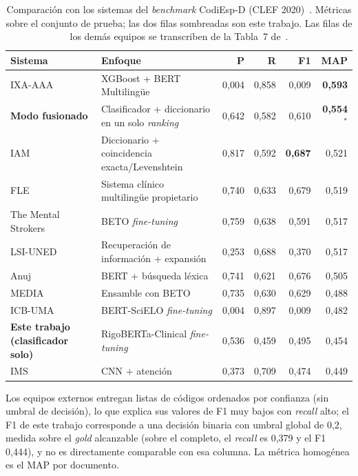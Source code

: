\begin{table}[!tp]
\centering
\small
\caption{Comparación con los sistemas del \emph{benchmark} CodiEsp-D (CLEF 2020)~\protect\cite{miranda2020}. Métricas sobre el conjunto de prueba; las dos filas sombreadas son este trabajo. Las filas de los demás equipos se transcriben de la Tabla~7 de~\cite{miranda2020}.}
\label{tab:codiesp-comparativa}
\begin{tabular}{P{3.6cm}P{4.0cm}rrrr}
\hline
\textbf{Sistema} & \textbf{Enfoque} & \textbf{P} & \textbf{R} & \textbf{F1} & \textbf{MAP} \\
\hline
IXA-AAA & XGBoost + BERT Multilingüe & 0{,}004 & 0{,}858 & 0{,}009 & \textbf{0{,}593} \\
\textbf{Modo fusionado} & Clasificador + diccionario en un solo \emph{ranking} & 0{,}642 & 0{,}582 & 0{,}610 & \textbf{0{,}554}$^{*}$ \\
IAM & Diccionario + coincidencia exacta/Levenshtein & 0{,}817 & 0{,}592 & \textbf{0{,}687} & 0{,}521 \\
FLE & Sistema clínico multilingüe propietario & 0{,}740 & 0{,}633 & 0{,}679 & 0{,}519 \\
The Mental Strokers & BETO \emph{fine-tuning} & 0{,}759 & 0{,}638 & 0{,}591 & 0{,}517 \\
LSI-UNED & Recuperación de información + expansión & 0{,}253 & 0{,}688 & 0{,}370 & 0{,}517 \\
Anuj & BERT + búsqueda léxica & 0{,}741 & 0{,}621 & 0{,}676 & 0{,}505 \\
MEDIA & Ensamble con BETO & 0{,}735 & 0{,}630 & 0{,}629 & 0{,}488 \\
ICB-UMA~\cite{lopezgarcia2020icb} & BERT-SciELO \emph{fine-tuning} & 0{,}004 & 0{,}897 & 0{,}009 & 0{,}482 \\
\textbf{Este trabajo (clasificador solo)} & RigoBERTa-Clinical \emph{fine-tuning} & 0{,}536 & 0{,}459 & 0{,}495 & 0{,}454 \\
IMS & CNN + atención & 0{,}373 & 0{,}709 & 0{,}474 & 0{,}449 \\
\hline
\end{tabular}

\vspace{2mm}
{\footnotesize Los equipos externos entregan listas de códigos ordenados por confianza (sin umbral de decisión), lo que explica sus valores de F1 muy bajos con \emph{recall} alto; el F1 de este trabajo corresponde a una decisión binaria con umbral global de 0,2, medida sobre el \emph{gold} alcanzable (sobre el completo, el \emph{recall} es 0,379 y el F1 0,444), y no es directamente comparable con esa columna. La métrica homogénea es el MAP por documento. 

}
\end{table}
